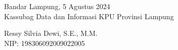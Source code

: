 \noindent Bandar Lampung, 5 Agustus 2024 \\
Kassubag Data dan Informasi KPU Provinsi Lampung

\vspace{3cm}

\noindent Ressy Silvia Dewi, S.E., M.M. \\
NIP: 198306092009022005

\newpage